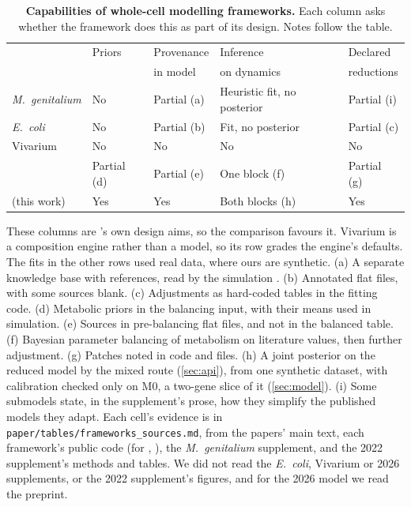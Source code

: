 \begin{table}[t]
\caption{\textbf{Capabilities of whole-cell modelling frameworks.} Each column asks whether the
framework does this as part of its design. Notes follow the table.}
\label{tab:frameworks}
\centering
\small
\begin{tabular}{@{}lllll@{}}
\toprule
& Priors & Provenance & Inference & Declared \\
& & in model & on dynamics & reductions \\
\midrule
\textit{M.\ genitalium} \cite{karr2012whole} & No & Partial (a) & Heuristic fit, no posterior & Partial (i) \\
\textit{E.\ coli} \cite{macklin2020simultaneous} & No & Partial (b) & Fit, no posterior & Partial (c) \\
Vivarium \cite{agmon2022vivarium} & No & No & No & No \\
\syn{} \cite{thornburg2022fundamental,thornburg2026bringing} & Partial (d) & Partial (e) & One block (f) & Partial (g) \\
\IC{} (this work) & Yes & Yes & Both blocks (h) & Yes \\
\bottomrule
\end{tabular}
\begin{flushleft}\footnotesize
These columns are \IC{}'s own design aims, so the comparison favours it. Vivarium is a
composition engine rather than a model, so its row grades the engine's defaults. The fits in the other rows used real data, where ours are synthetic. (a) A separate knowledge base with references, read by the simulation \cite{karr2012wholecellkb}.
(b) Annotated flat files, with some sources blank. (c) Adjustments as hard-coded tables in the
fitting code. (d) Metabolic priors in the balancing input, with their means used in simulation.
(e) Sources in pre-balancing flat files, and not in the balanced table. (f) Bayesian parameter
balancing of metabolism on literature values, then further adjustment. (g) Patches noted in code
and files. (h) A joint posterior on the reduced \syn{} model by the mixed route (\cref{sec:api}), from one
synthetic dataset, with calibration checked only on M0, a two-gene slice of it (\cref{sec:model}). (i) Some submodels state, in the
supplement's prose, how they simplify the published models they adapt. Each cell's evidence is in
\texttt{paper/tables/frameworks\_sources.md}, from the papers' main text, each framework's public
code (for \syn{}, \cite{thornburg2021minimal}), the \textit{M.\ genitalium} supplement, and the 2022 \syn{}
supplement's methods and tables.
We did not read the \textit{E.\ coli}, Vivarium or 2026 \syn{} supplements, or the 2022 \syn{}
supplement's figures, and for the 2026 \syn{} model we read the preprint.
\end{flushleft}
\end{table}

